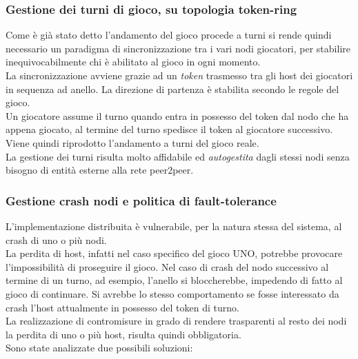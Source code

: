 \documentclass[10pt,a4paper]{article}
\begin{document}
\subsubsection{Gestione dei turni di gioco, su topologia token-ring}
Come è già stato detto l'andamento del gioco procede a turni si rende quindi necessario un paradigma di sincronizzazione tra i vari nodi giocatori, per stabilire inequivocabilmente chi è abilitato al gioco in ogni momento.\\ La sincronizzazione avviene grazie ad un \textit{token} trasmesso tra gli host dei giocatori in sequenza ad anello. La direzione di partenza è stabilita secondo le regole del gioco.\\ Un giocatore assume il turno quando entra in possesso del token dal nodo che ha appena giocato, al termine del turno spedisce il token al giocatore successivo. Viene quindi riprodotto l'andamento a turni del gioco reale.\\
La gestione dei turni risulta molto affidabile ed \textit{autogestita} dagli stessi nodi senza bisogno di entità esterne alla rete peer2peer.

\subsubsection{Gestione crash nodi e politica di fault-tolerance}
L'implementazione distribuita è vulnerabile, per la natura stessa del sistema, al crash di uno o più nodi. \\La perdita di host, infatti nel caso specifico del gioco UNO, potrebbe provocare l'impossibilità di proseguire il gioco. Nel caso di crash del nodo successivo al termine di un turno, ad esempio, l'anello si bloccherebbe, impedendo di fatto al gioco di continuare. Si avrebbe lo stesso comportamento se fosse interessato da crash l'host attualmente in possesso del token di turno.\\ La realizzazione di contromisure in grado di rendere trasparenti al resto dei nodi la perdita di uno o più host, risulta quindi obbligatoria. \\ Sono state analizzate due possibili soluzioni:
\end{document}
